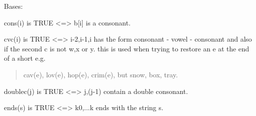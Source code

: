 \documentclass[letterpaper,10pt,english]{sphinxmanual}
\begin{document}
\begin{fulllineitems}
\label{\detokenize{porter:porter.PorterStemmer}}
Bases: 

\begin{fulllineitems}
\label{\detokenize{porter:porter.PorterStemmer.cons}}
cons(i) is TRUE \textless{}=\textgreater{} b{[}i{]} is a consonant.

\end{fulllineitems}


\begin{fulllineitems}
\label{\detokenize{porter:porter.PorterStemmer.cvc}}
cvc(i) is TRUE \textless{}=\textgreater{} i-2,i-1,i has the form consonant - vowel - consonant
and also if the second c is not w,x or y. this is used when trying to
restore an e at the end of a short  e.g.
\begin{quote}

cav(e), lov(e), hop(e), crim(e), but
snow, box, tray.
\end{quote}

\end{fulllineitems}


\begin{fulllineitems}
\label{\detokenize{porter:porter.PorterStemmer.doublec}}
doublec(j) is TRUE \textless{}=\textgreater{} j,(j-1) contain a double consonant.

\end{fulllineitems}


\begin{fulllineitems}
\label{\detokenize{porter:porter.PorterStemmer.ends}}
ends(s) is TRUE \textless{}=\textgreater{} k0,...k ends with the string s.

\end{fulllineitems}



\end{fulllineitems}
\end{document}

